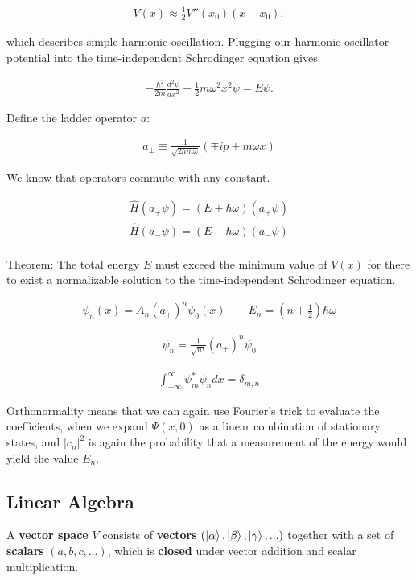 \documentclass{article}
\begin{document}
\begin{gather*}
    V(x) \approx \frac{1}{2} V''(x_{0}) (x-x_{0}),
\end{gather*}

which describes simple harmonic oscillation. Plugging our harmonic oscillator potential into the time-independent Schrodinger equation gives

\begin{gather*}
    -\frac{\hbar^2}{2m}\frac{d^2\psi}{dx^2} + \frac{1}{2} m \omega^2 x^2 \psi = E \psi.
\end{gather*}

Define the ladder operator $a$:

\begin{gather*}
    a_{\pm} \equiv \frac{1}{\sqrt{2 \hbar m \omega}} \left ( \mp ip + m\omega x\right ) 
\end{gather*}

We know that operators commute with any constant.

\begin{gather*}
    \hat{H}(a_{+} \psi ) = (E + \hbar \omega) (a_{+}\psi ) \\
    \hat{H}(a_{-} \psi ) = (E - \hbar \omega) (a_{-}\psi ) \\
\end{gather*}

Theorem: The total energy $E$ must exceed the minimum value of $V(x)$ for there to exist a normalizable solution to the time-independent Schrodinger equation. 

\begin{gather*}
    \psi_{n}(x) = A_{n} (a_{+})^{n} \psi_{0}(x) \quad \quad E_{n} = \left ( n + \frac{1}{2} \right ) \hbar \omega
\end{gather*}

\begin{gather*}
    \psi_{n} = \frac{1}{\sqrt{n!}}(a_{+})^{n} \psi_{0}
\end{gather*}

\begin{gather*}
    \int_{-\infty}^{\infty} \psi_{m}^{*}\psi_{n}dx = \delta_{m,n}
\end{gather*}

Orthonormality means that we can again use Fourier's trick to evaluate the coefficients, when we expand $\Psi(x,0)$ as a linear combination of stationary states, and $|c_{n}|^2$ is again the probability that a measurement of the energy would yield the value $E_{n}$.

\subsection{Linear Algebra} 
A \textbf{vector space} $V$ consists of \textbf{vectors} $(\ket{\alpha}, \ket{\beta}, \ket{\gamma},...)$ together with a set of \textbf{scalars} $(a,b,c,...)$, which is \textbf{closed} under vector addition and scalar multiplication. \\
\end{document}
